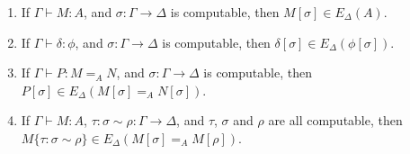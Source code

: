 \begin{theorem}$ $
\begin{enumerate}
\item
If $\Gamma \vdash M : A$, and $\sigma : \Gamma \rightarrow \Delta$ is computable,
then $M [ \sigma ] \in E_\Delta(A)$.
\item
If $\Gamma \vdash \delta : \phi$, and $\sigma : \Gamma \rightarrow \Delta$ is computable,
then $\delta [ \sigma ] \in E_\Delta(\phi[\sigma])$.
\item
If $\Gamma \vdash P : M =_A N$, and $\sigma : \Gamma \rightarrow \Delta$ is computable,
then $P [ \sigma ] \in E_\Delta(M [ \sigma ] =_A N [ \sigma ])$.
\item
\label{computable-path-sub}
If $\Gamma \vdash M : A$, $\tau : \sigma \sim \rho : \Gamma \rightarrow \Delta$, and $\tau$, $\sigma$
and $\rho$ are all computable, then $M \{ \tau : \sigma \sim \rho \} \in E_\Delta(M [ \sigma ] =_A M [ \rho ])$.
\end{enumerate}
\end{theorem}

